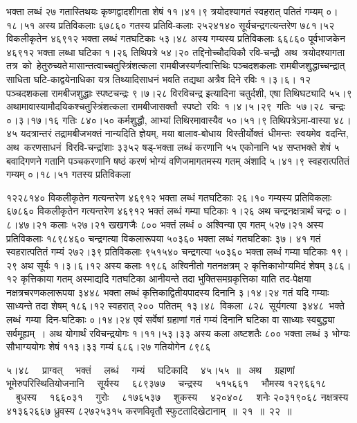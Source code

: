 \documentclass[11pt, openany]{book}
\begin{document}
\newpage

\noindent भक्ता लब्धं २७ गतास्तिथयः कृष्णद्वादशीगता शेषं ११।४१।९ त्रयोदश्यागतं स्वहरात् पतितं गम्यम् ०।१८।५१ अस्य प्रतिविकलाः ६७८६० गतस्य प्रतिवि-कलाः २५२४१४० सूर्यचन्द्रगत्यन्तरेण ७८१।५२ विकलीकृतेन ४६९१२ भक्ता लब्धं गतघटिकाः ५३।४८ अस्य गम्यस्य प्रतिविकलाः ६६८६० पूर्वभाजकेन ४६९१२ भक्ता लब्धा घटिका १।२६ तिथिपत्रे ५४।२० तद्दिनोच्चौदयिकौ रवि-चन्द्रौ \,अथ \,त्रयोदश्यागता \,तत्र \,को \,हेतुरुच्यते\textendash \,मासान्तत्वाच्चतुस्त्रिंशत्कला रामबीजस्यर्णत्वात्तिथिः पञ्चदशकलाः रामबीजशुद्धाच्चन्द्रात् साधिता घटि-काद्वयेनाधिका यत्र तिथ्यादिसाधनं भवति तद्यथा अत्रैव दिने रविः १।३।६। १२ पञ्चदशकला रामबीजशुद्धाः स्पष्टचन्द्रः ९।७।२८ विरविचन्द्र इत्यादिना चतुर्दशी, एषा तिथिघट्यादि ५५।९ अथामावास्यामौदयिकश्चतुस्त्रिंशत्कला रामबीजासक्तौ \,स्पष्टो \,रविः \,१।४।५।२९ \,गतिः \,५७।२८ \,चन्द्रः \,०।३।१७।१६ गतिः ८४०।५० कर्मशुद्धौ, आभ्यां तिथिरमावास्यैव ५०।५१।९ तिथिपत्रेऽमा-वास्या ४८।४५ यदत्रान्तरं \;तद्रामबीजभक्तं नान्यदिति ज्ञेयम्, मया बालाव-बोधाय \,विस्तीर्योक्तं \,धीमन्तः \,स्वयमेव \,वदन्ति, \,अथ \,करणसाधनं \,विरवि-चन्द्रांशाः ३३५२ षड्-भक्ता लब्धं करणानि ५५ एकोनानि ५४ सप्तभक्ते शेषं ५ बवादिगणने गतानि पञ्चकरणानि षष्ठं करणं भोग्यं वणिजमागतमस्य गतम् अंशादि ५।४१।९ स्वहरात्पतितं गम्यम् ०।१८।५१ गतस्य प्रतिविकला

\newpage

\noindent १२२८१४० विकलीकृतेन गत्यन्तरेण ४६९१२ भक्ता लब्धं गतघटिकाः २६।१० गम्यस्य प्रतिविकलाः ६७८६० विकलीकृतेन गत्यन्तरेण ४६९१२ भक्तं लब्धं गम्या घटिकाः १।२६ अथ चन्द्रनक्षत्रार्थं चन्द्रः ०।८।४७।२१ कलाः ५२७।२१ खखगजैः ८०० भक्तं लब्धं ० अश्विन्या एव गतम् ५२७।२१ अस्य प्रतिविकलाः १८९८४६० \;चन्द्रगत्या \;विकलारूपया \;५०३६० \;भक्ता \;लब्धं \;गतघटिकाः \;३७। ४१ गतं स्वहरात्पतितं गम्यं २७२।३९ प्रतिविकलाः ९५१५४० चन्द्रगत्या ५०३६० भक्ता लब्धं गम्या घटिकाः १९।२९ अथ सूर्यः १।३।६।१२ अस्य कलाः १९८६ अश्विनीतो गतनक्षत्रम् २ कृत्तिकाभोग्यमिदं शेषम् ३८६।१२ कृत्तिकाया गतम् अस्माद्यदि गतघटिका आनीयन्ते तदा भुक्तिसमग्रकृत्तिका याति तद-पेक्षया \;नक्षत्रचरणकलारूपया \;३४४८ \;भक्ता \;लब्धं \;कृत्तिकाद्वितीयपादस्य दिनानि ३।१४।२४ गतं यदि गम्याः साध्यन्ते तदा शेषम् १८६।१२ स्वहरात् २०० \,पतितम् \,१३।४८ \,विकला \,८२८ \,सूर्यगत्या \,३४४८ \,भक्ते \,लब्धं \,गम्या \,दिन-घटिकाः ०।१४।२४ एवं सर्वेषां ग्रहाणां गतं गम्यं दिनानि घटिका वा साध्याः स्वबुद्ध्या सर्वमूह्यम्~। अथ योगार्थं रविचन्द्रयोगः १।११।५३।३३ अस्य कला अष्टशतैः ८०० भक्ता लब्धं ३ भोग्यः सौभाग्ययोगः शेषं ११३।३३ गम्यं ६८६।२७ गतियोगेन ८९८६

\newpage

\noindent ५।४८ ~~प्राग्वत् ~~भक्तं ~~लब्धं ~~गम्यं ~~घटिकादि ~~४५।५५~॥ ~अथ ~~ग्रहाणां भूमेरुपरिस्थितियोजनानि ~~सूर्यस्य ~~६८९३७७ ~~चन्द्रस्य ~~५१५६६१ ~~भौमस्य १२९६६१८ ~~बुधस्य ~~१६६०३१ ~~गुरोः ~~८१७६५३७ ~~शुकस्य ~~४२०४०८ ~~शनेः २०३१९०६८ नक्षत्रस्य ४१३६२६६७ ध्रुवस्य ८२७२५३१५ करणविवृतौ स्फुटतादिखेटानाम्~॥~२१~॥~२२~॥
\vspace{2mm}
\end{document}
